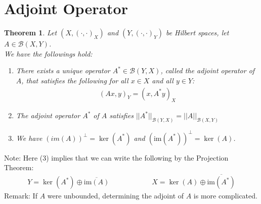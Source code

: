 \documentclass[11pt]{book}
\theoremstyle{break}
\theoremstyle{break}
\newtheorem{thm}{Theorem}[section]
\newcommand{\im}{\text{im}}
\newcommand{\note}{\color{red}Note: \color{black}}
\newcommand{\remark}{\color{blue}Remark: \color{black}}
\begin{document}
\newpage
\section[Adjoint Operator]{\color{red}Adjoint Operator \color{black}}
\begin{thm}
Let $(X,(\cdot,\cdot)_X)$ and $(Y,(\cdot,\cdot)_Y)$ be Hilbert spaces, let $A\in \mathcal{B}(X,Y)$. \\
We have the followings hold:
\begin{enumerate}[topsep=3pt,itemsep=-1ex,partopsep=1ex,parsep=1ex]
\item There exists a unique operator $A^* \in \mathcal{B}(Y,X)$, called the adjoint operator of $A$, that satisfies the following for all $x \in X$ and all $y \in Y$:
\begin{align*}
(Ax,y)_Y = (x,A^*y)_X
\end{align*}
\item The adjoint operator $A^*$ of $A $ satisfies $||A^*||_{\mathcal{B}(Y,X)} = ||A||_{\mathcal{B}(X,Y)}$
\item We have $(im(A))^\perp = \ker(A^*)$ and $(\im(A^*))^{\perp} = \ker(A)$.
\end{enumerate}
\end{thm}
\note Here (3) implies that we can write the following by the Projection Theorem:
\begin{align*}
Y = \ker(A^*) \oplus \overline{\im(A)}\qquad\qquad\qquad X = \ker(A) \oplus \overline{\im(A^*)}
\end{align*}
\remark If $A$ were unbounded, determining the adjoint of $A$ is more complicated.
\end{document}
